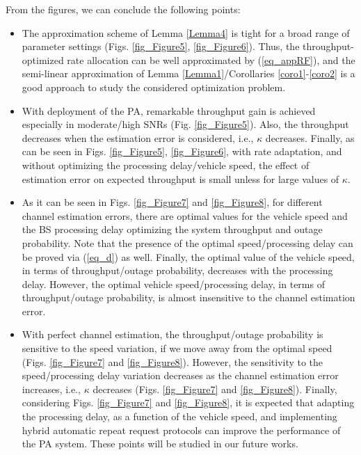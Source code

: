 From the figures, we can conclude the following points:
\begin{itemize}
    \item The approximation scheme of Lemma \ref{Lemma4} is tight for a broad range of parameter settings (Figs. \ref{fig_Figure5}, \ref{fig_Figure6}). Thus, the throughput-optimized rate allocation can be well approximated by (\ref{eq_appRF}), and the semi-linear approximation of Lemma \ref{Lemma1}/Corollaries \ref{coro1}-\ref{coro2} is a good approach to study the considered optimization problem.
    
    \item With deployment of the PA, remarkable throughput gain is achieved especially in moderate/high SNRs (Fig. \ref{fig_Figure5}). Also, the throughput decreases when the estimation error is considered, i.e., $\kappa$ decreases. Finally, as can be seen in Figs.  \ref{fig_Figure5}, \ref{fig_Figure6}, with rate adaptation,  and without optimizing the processing delay/vehicle speed, the effect of estimation error on expected throughput  is small unless for large values of $\kappa$.

    
    \item As it can be seen in Figs. \ref{fig_Figure7} and \ref{fig_Figure8}, for different channel estimation errors, there are optimal values for the vehicle speed and the BS processing delay optimizing the system throughput and outage probability. Note that the presence of the optimal speed/processing delay can be proved via (\ref{eq_d}) as well. Finally, the optimal value of the vehicle speed, in terms of throughput/outage probability, decreases with the processing delay. However, the optimal vehicle speed/processing delay, in terms of throughput/outage probability, is almost insensitive to the channel estimation error.

    \item With perfect channel estimation, the throughput/outage probability is sensitive to the speed variation, if we move away from the optimal speed (Figs. \ref{fig_Figure7} and \ref{fig_Figure8}). However, the sensitivity to the speed/processing delay variation decreases as the channel estimation error increases, i.e., $\kappa$ decreases (Figs. \ref{fig_Figure7} and \ref{fig_Figure8}). Finally, considering Figs. \ref{fig_Figure7} and \ref{fig_Figure8}, it is expected that adapting the processing delay, as a function of the vehicle speed, and implementing hybrid automatic repeat request protocols can improve the performance of the PA system. These points will be studied in our future works.

\end{itemize}





